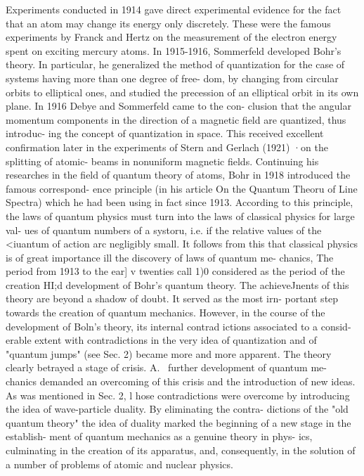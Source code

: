 \documentclass[a4paper,sfsidenotes,colorlinks=true]{tufte-book}
\numberwithin{equation}{section}
\numberwithin{figure}{section}
\begin{document}
{{{{{{Experiments conducted in 1914 gave direct experimental evidence for the fact that an atom may change its energy only discretely. These were the famous experiments by Franck and Hertz on the measurement of the electron energy spent on exciting mercury atoms.
In 1915-1916, Sommerfeld developed Bohr's theory. In particular, he generalized the method of quantization for the case of systems having more than one degree of free- dom, by changing from circular orbits to elliptical ones, and studied the precession of an elliptical orbit in its own plane. In 1916 Debye and Sommerfeld came to the con- clusion that the angular momentum components in the direction of a magnetic field are quantized, thus introduc- ing the concept of quantization in space. This received excellent confirmation later in the experiments of Stern and Gerlach (1921) ·on the splitting of atomic- beams in nonuniform magnetic fields.
Continuing his researches in the field of quantum theory of atoms, Bohr in 1918 introduced the famous correspond- ence principle (in his article On the Quantum Theoru of Line Spectra) which he had been using in fact since 1913. According to this principle, the laws of quantum physics
must turn into the laws of classical physics for large val- ues of quantum numbers of a systoru, i.e. if the relative values of the <iuantum of action arc negligibly small. It follows from this that classical physics is of great importance ill the discovery of laws of quantum me- chanics, The period from 1913 to the ear] v twenties call 1)0 considered as the period of the creation HI;d development of Bohr's quantum theory. The achieveJnents of this theory are beyond a shadow of doubt. It served as the most irn- portant step towards the creation of quantum mechanics. However, in the course of the development of Boln's theory, its internal contrad ictions associated to a consid-
erable extent with contradictions in the very idea of quantization and of "quantum jumps" (see Sec. 2) became more and more apparent. The theory clearly betrayed a stage of crisis. A.~ further development of quantum me- chanics demanded an overcoming of this crisis and the introduction of new ideas. As was mentioned in Sec. 2, l hose contradictions were overcome by introducing the idea of wave-particle duality. By eliminating the contra- dictions of the "old quantum theory" the idea of duality marked the beginning of a new stage in the establish- ment of quantum mechanics as a genuine theory in phys- ics, culminating in the creation of its apparatus, and, consequently, in the solution of a number of problems of atomic and nuclear physics.
}}}}}}
\end{document}
